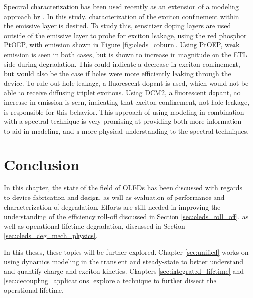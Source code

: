 \documentclass[../thesis.tex]{subfiles}
\begin{document}
Spectral characterization has been used recently as an extension of a modeling approach by \textcite{Coburn2017}.
In this study, characterization of the exciton confinement within the emissive layer is desired.  
To study this, sensitizer doping layers are used outside of the emissive layer to probe for exciton leakage, using the red phosphor PtOEP, with emission shown in Figure \ref{fig:oleds_coburn}.
Using PtOEP, weak emission is seen in both cases, but is shown to increase in magnitude on the ETL side during degradation.  
This could indicate a decrease in exciton confinement, but would also be the case if holes were more efficiently leaking through the device.
To rule out hole leakage, a fluorescent dopant is used, which would not be able to receive diffusing triplet excitons.
Using DCM2, a fluorescent dopant, no increase in emission is seen, indicating that exciton confinement, not hole leakage, is responsible for this behavior.
This approach of using modeling in combination with a spectral technique is very promising at providing both more information to aid in modeling, and a more physical understanding to the spectral techniques.


\section{Conclusion}

In this chapter, the state of the field of OLEDs has been discussed with regards to device fabrication and design, as well as evaluation of performance and characterization of degradation.
Efforts are still needed in improving the understanding of the efficiency roll-off discussed in Section \ref{sec:oleds_roll_off}, as well as operational lifetime degradation, discussed in Section \ref{sec:oleds_deg_mech_physics}.

In this thesis, these topics will be further explored.
Chapter \ref{sec:unified} works on using dynamics modeling in the transient and steady-state to better understand and quantify charge and exciton kinetics.
Chapters \ref{sec:integrated_lifetime} and \ref{sec:decoupling_applications} explore a technique to further dissect the operational lifetime.


\end{document}
